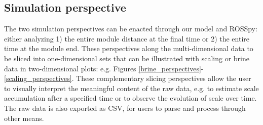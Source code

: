 \subsection{Simulation perspective}
The two simulation perspectives can be enacted through our model and ROSSpy: either analyzing 1) the entire module distance at the final time or 2) the entire time at the module end. These perspectives along the multi-dimensional data to be sliced into one-dimensional sets that can be illustrated with scaling or brine data in two-dimensional plots: e.g. Figures \ref{brine_perspectives}-\ref{scaling_perspectives}. These complementary slicing perspectives allow the user to visually interpret the meaningful content of the raw data, e.g. to estimate scale accumulation after a specified time \cite{Chai2007UltrasoundModules} or to observe the evolution of scale over time. The raw data is also exported as CSV, for users to parse and process through other means.


